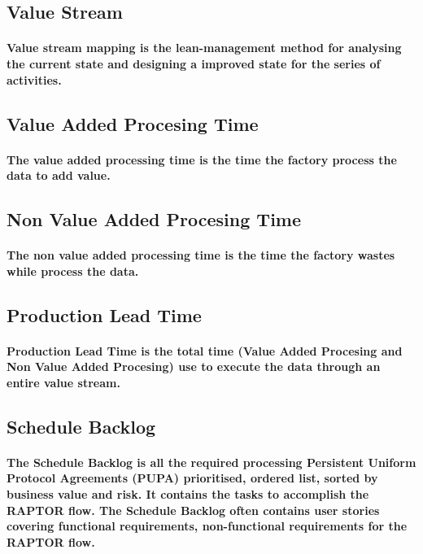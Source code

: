 \subsection{Value Stream}
\paragraph{Value stream mapping is the lean-management method for analysing the current state and designing a improved state for the series of activities.}
\subsection{Value Added Procesing Time}
\paragraph{The value added processing time is the time the factory process the data to add value.}
\subsection{Non Value Added Procesing Time}
\paragraph{The non value added processing time is the time the factory wastes while process the data.}
\subsection{Production Lead Time}
\paragraph{Production Lead Time is the total time (Value Added Procesing and Non Value Added Procesing) use to execute the data through an entire value stream.}
\subsection{Schedule Backlog}
\paragraph{The Schedule Backlog is all the required processing Persistent Uniform Protocol Agreements (PUPA) prioritised, ordered list, sorted by business value and risk. It contains the tasks to accomplish the RAPTOR flow. The Schedule Backlog often contains user stories covering functional requirements, non-functional requirements for the RAPTOR flow.}
